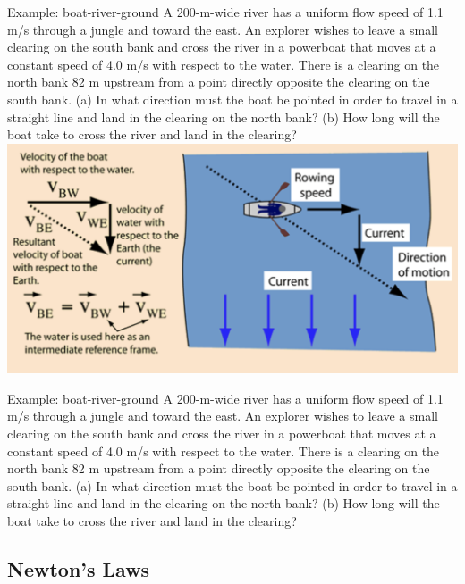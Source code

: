  \begin{frame}{Example: boat-river-ground}
\notsotiny
A 200-m-wide river has a uniform flow speed of 1.1 m/s through a jungle and toward the east. An explorer wishes to leave a small clearing on the south bank and cross the river in a powerboat that moves at a constant speed of 4.0 m/s with respect to the water. There is a clearing on the north bank 82 m upstream from a point directly opposite the clearing on the south bank. (a) In what direction must the boat be pointed in order to travel in a straight line and land in the clearing on the north bank? (b) How long will the boat take to cross the river and land in the clearing?
\includegraphics[scale=0.3]{boat}%
\vspace{5cm}
\end{frame}


 \begin{frame}{Example: boat-river-ground}
\notsotiny
A 200-m-wide river has a uniform flow speed of 1.1 m/s through a jungle and toward the east. An explorer wishes to leave a small clearing on the south bank and cross the river in a powerboat that moves at a constant speed of 4.0 m/s with respect to the water. There is a clearing on the north bank 82 m upstream from a point directly opposite the clearing on the south bank. (a) In what direction must the boat be pointed in order to travel in a straight line and land in the clearing on the north bank? (b) How long will the boat take to cross the river and land in the clearing?

\vspace{8cm}
\end{frame}

 \subsection{Newton's Laws}
 

